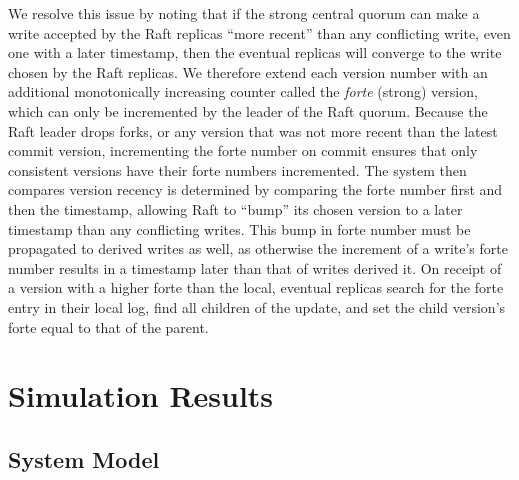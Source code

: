 \documentclass[10pt,conference,letterpaper]{IEEEtran}
\begin{document}
We resolve this issue by noting that if the strong central quorum can make a write
accepted by the Raft replicas ``more recent'' than any conflicting write, even one with a
later timestamp, then the eventual replicas will converge to the write chosen by the Raft
replicas.
We therefore extend each version number with an additional monotonically increasing
counter called the \textit{forte} (strong) version, which can only be incremented by the
leader of the Raft quorum.
Because the Raft leader drops forks, or any version that was not more recent than the
latest commit version, incrementing the forte number on commit ensures that only
consistent versions have their forte numbers incremented.
The system then compares version recency is determined by comparing the forte number first
and then the timestamp, allowing Raft to ``bump'' its chosen version to a later timestamp
than any conflicting writes.
This bump in forte number must be propagated to derived writes as well, as otherwise the
increment of a write's forte number results in a timestamp later than that of writes
derived it.
On receipt of a version with a higher forte
than the local, eventual replicas search for the forte entry in their local log, find
all children of the update, and set the child version's forte equal to that of the parent.


\section{Simulation Results}

\subsection{System Model}
\end{document}
